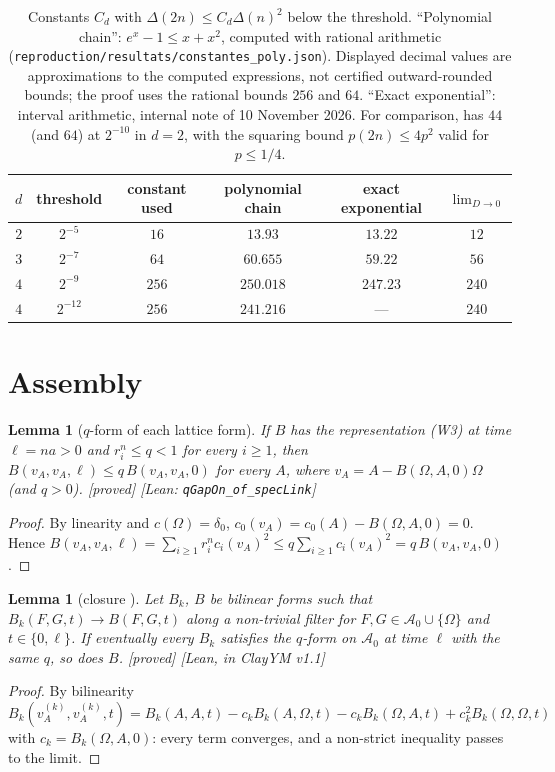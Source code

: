 \documentclass[11pt,a4paper]{article}
\theoremstyle{plain}
\newtheorem{lemma}[theorem]{Lemma}
\theoremstyle{definition}
\theoremstyle{remark}
\numberwithin{equation}{section}
\newcommand{\st}[1]{\textsf{[#1]}}
\newcommand{\cA}{\mathcal{A}}
\begin{document}
\begin{table}[ht]
\centering\footnotesize
\begin{tabular}{@{}cccccc@{}}
\toprule
$d$ & threshold & constant used & polynomial chain & exact exponential \cite{internal} & $\lim_{D\to0}$ \\
\midrule
$2$ & $2^{-5}$ & $16$ & $13.93$ & $13.22$ & $12$ \\
$3$ & $2^{-7}$ & $64$ & $60.655$ & $59.22$ & $56$ \\
$4$ & $2^{-9}$ & $256$ & $250.018$ & $247.23$ & $240$ \\
$4$ & $2^{-12}$ & $256$ & $241.216$ & --- & $240$ \\
\bottomrule
\end{tabular}
\caption{Constants $C_d$ with $\Delta(2n)\le C_d\Delta(n)^2$ below the threshold. ``Polynomial chain'': $e^x-1\le x+x^2$, computed
with rational arithmetic (\texttt{reproduction/resultats/constantes\_poly.json}). Displayed decimal values are approximations to the computed expressions, not certified outward-rounded bounds; the proof uses the rational bounds $256$ and $64$. ``Exact exponential'': interval arithmetic, internal note of 10 November 2026. For
comparison, \cite[(2.12)]{OAI26} has $44$ (and $64$) at $2^{-10}$ in $d=2$, with the squaring bound $p(2n)\le4p^2$ valid for
$p\le1/4$.}
\label{tab:const}
\end{table}

\section{Assembly}\label{sec:assembly}

\begin{lemma}[$q$-form of each lattice form]\label{lem:qform}
If $B$ has the representation (W3) at time $\ell=na>0$ and $r_i^n\le q<1$ for every $i\ge1$, then $B(v_A,v_A,\ell)\le q\,B(v_A,v_A,0)$ for
every $A$, where $v_A=A-B(\Omega,A,0)\Omega$ (and $q>0$). \st{proved} \st{Lean: \texttt{qGapOn\_of\_specLink}}
\end{lemma}
\begin{proof}
By linearity and $c(\Omega)=\delta_0$, $c_0(v_A)=c_0(A)-B(\Omega,A,0)=0$. Hence $B(v_A,v_A,\ell)=\sum_{i\ge1}r_i^nc_i(v_A)^2\le
q\sum_{i\ge1}c_i(v_A)^2=q\,B(v_A,v_A,0)$.
\end{proof}

\begin{lemma}[closure {\cite[\texttt{QGapOn.of\_tendsto}]{ClayYM}}]\label{lem:closure}
Let $B_k$, $B$ be bilinear forms such that $B_k(F,G,t)\to B(F,G,t)$ along a non-trivial filter for $F,G\in\cA_0\cup\{\Omega\}$ and
$t\in\{0,\ell\}$. If eventually every $B_k$ satisfies the $q$-form on $\cA_0$ at time $\ell$ with the same $q$, so does $B$.
\st{proved} \st{Lean, in ClayYM v1.1}
\end{lemma}
\begin{proof}
By bilinearity $B_k(v^{(k)}_A,v^{(k)}_A,t)=B_k(A,A,t)-c_kB_k(A,\Omega,t)-c_kB_k(\Omega,A,t)+c_k^2B_k(\Omega,\Omega,t)$ with
$c_k=B_k(\Omega,A,0)$: every term converges, and a non-strict inequality passes to the limit.
\end{proof}
\end{document}
